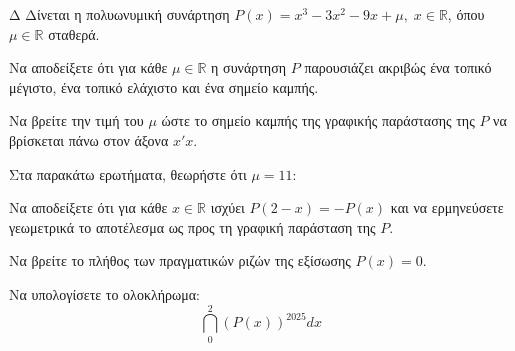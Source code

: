 \begin{thema}{Δ}
Δίνεται η πολυωνυμική συνάρτηση $\displaystyle P(x) = x^3 - 3x^2 - 9x + \mu, \; x \in \mathbb{R}$, όπου $\mu \in \mathbb{R}$ σταθερά.
\begin{erwthma}
    \item Να αποδείξετε ότι για κάθε $\mu \in \mathbb{R}$ η συνάρτηση $P$ παρουσιάζει ακριβώς ένα τοπικό μέγιστο, ένα τοπικό ελάχιστο και ένα σημείο καμπής.
    \item Να βρείτε την τιμή του $\mu$ ώστε το σημείο καμπής της γραφικής παράστασης της $P$ να βρίσκεται πάνω στον άξονα $x'x$.
\end{erwthma}
Στα παρακάτω ερωτήματα, θεωρήστε ότι $\mu = 11$:
\begin{erwthma}[resume]
    \item \begin{alist}
        \item Να αποδείξετε ότι για κάθε $x \in \mathbb{R}$ ισχύει $P(2-x) = -P(x)$ και να ερμηνεύσετε γεωμετρικά το αποτέλεσμα ως προς τη γραφική παράσταση της $P$.
        \item Να βρείτε το πλήθος των πραγματικών ριζών της εξίσωσης $P(x) = 0$.
    \end{alist}
    \item Να υπολογίσετε το ολοκλήρωμα:
    \[ \dint_0^2 \left(P(x)\right)^{2025} dx \]
\end{erwthma}
\end{thema}
